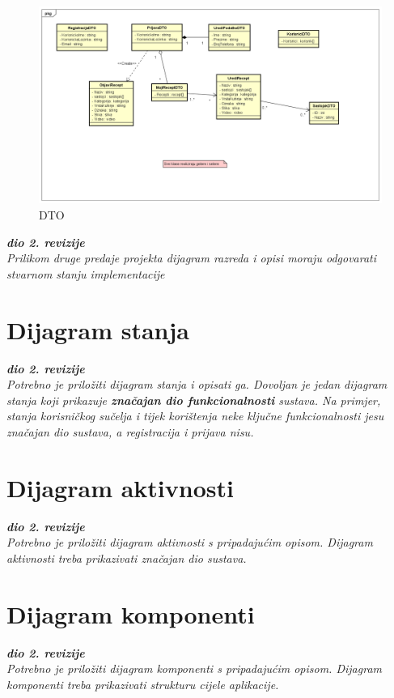 \begin{figure}[H]
	\includegraphics[width=\textwidth]{slike/DTO.png} %
	\centering
	\caption{DTO}
	\label{fig:dijagramdto}
\end{figure}

\textbf{\textit{dio 2. revizije}}\\

\textit{Prilikom druge predaje projekta dijagram razreda i opisi moraju odgovarati stvarnom stanju implementacije}



\eject

\section{Dijagram stanja}


\textbf{\textit{dio 2. revizije}}\\

\textit{Potrebno je priložiti dijagram stanja i opisati ga. Dovoljan je jedan dijagram stanja koji prikazuje \textbf{značajan dio funkcionalnosti} sustava. Na primjer, stanja korisničkog sučelja i tijek korištenja neke ključne funkcionalnosti jesu značajan dio sustava, a registracija i prijava nisu. }


\eject

\section{Dijagram aktivnosti}

\textbf{\textit{dio 2. revizije}}\\

\textit{Potrebno je priložiti dijagram aktivnosti s pripadajućim opisom. Dijagram aktivnosti treba prikazivati značajan dio sustava.}

\eject
\section{Dijagram komponenti}

\textbf{\textit{dio 2. revizije}}\\

\textit{Potrebno je priložiti dijagram komponenti s pripadajućim opisom. Dijagram komponenti treba prikazivati strukturu cijele aplikacije.}